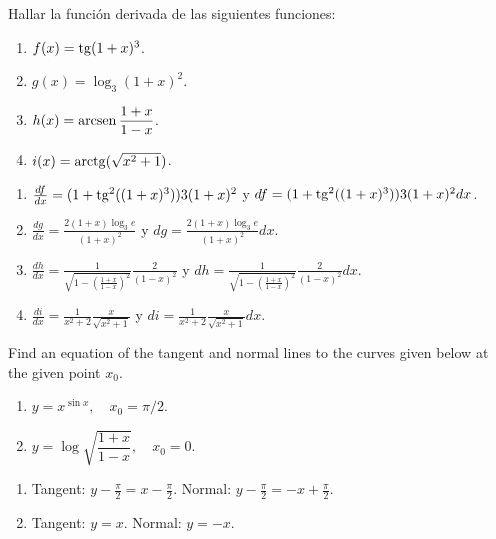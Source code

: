 {Hallar la función derivada de las siguientes funciones:
\begin{multicols}{2}
\begin{enumerate}
\item $f(x)=\operatorname{tg}(1+x)^3$.
\item $g(x)=\log_{3}(1+x)^2$.
\item $h(x)=\operatorname{arcsen}\dfrac{1+x}{1-x}$.
\item $i(x)= \operatorname{arctg}(\sqrt{x^2+1})$.
\end{enumerate}
\end{multicols}
}
{\begin{enumerate}
\item $\frac{df}{dx} = (1 + \operatorname{tg}^2((1+x)^3))3(1+x)^2$ y $df = (1 + \operatorname{tg}^2((1+x)^3))3(1+x)^2 dx$.
\item $\frac{dg}{dx} = \frac{2(1+x)\log_3e}{(1+x)^2}$ y $dg = \frac{2(1+x)\log_3e}{(1+x)^2} dx$.
\item $\frac{dh}{dx} = \frac{1}{\sqrt{1-\left(\frac{1+x}{1-x}\right)^2}}\frac{2}{(1-x)^2}$ y $dh = \frac{1}{\sqrt{1-\left(\frac{1+x}{1-x}\right)^2}}\frac{2}{(1-x)^2} dx$.
\item $\frac{di}{dx} = \frac{1}{x^2+2}\frac{x}{\sqrt{x^2+1}}$ y $di = \frac{1}{x^2+2}\frac{x}{\sqrt{x^2+1}} dx$.
\end{enumerate}
}
{
}


{Find an equation of the tangent and normal lines to the curves given below at the given point $x_0$.
\begin{multicols}{2}
\begin{enumerate}
\item  $y=x^{\sin x},\quad x_{0}=\pi/2$.
\item  $y=\log \sqrt{\dfrac{1+x}{1-x}}, \quad x_{0}=0$.
\end{enumerate}
\end{multicols}
}
{\begin{enumerate}
\item Tangent: $y-\frac{\pi}{2} = x-\frac{\pi}{2}$. Normal: $y-\frac{\pi}{2} = -x+\frac{\pi}{2}$.
\item Tangent: $y = x$. Normal: $y = -x$.
\end{enumerate}
}
{
}


